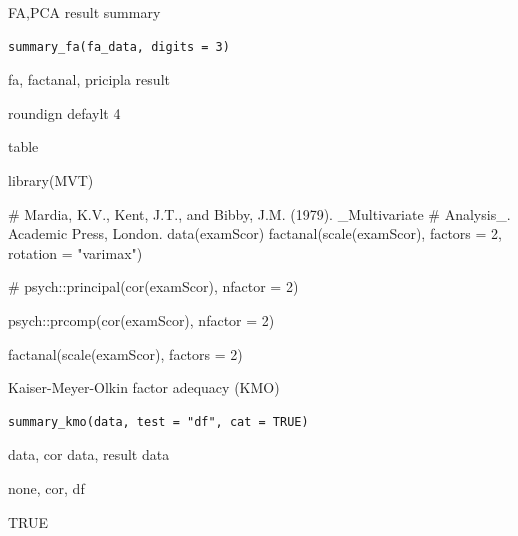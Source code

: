 \documentclass[a4paper]{book}
\begin{document}
%
\begin{Description}
FA,PCA result summary
\end{Description}
%
\begin{Usage}
\begin{verbatim}
summary_fa(fa_data, digits = 3)
\end{verbatim}
\end{Usage}
%
\begin{Arguments}
\begin{ldescription}
\item[\code{fa\_data}] fa, factanal, pricipla result

\item[\code{digits}] roundign defaylt 4
\end{ldescription}
\end{Arguments}
%
\begin{Value}
table
\end{Value}
%
\begin{Examples}
\begin{ExampleCode}

library(MVT)

#  Mardia, K.V., Kent, J.T., and Bibby, J.M. (1979).  _Multivariate
#  Analysis_. Academic Press, London.
data(examScor)
factanal(scale(examScor), factors = 2, rotation = "varimax")%

#
psych::principal(cor(examScor), nfactor = 2) %

psych::prcomp(cor(examScor), nfactor = 2) %

factanal(scale(examScor), factors = 2) %

\end{ExampleCode}
\end{Examples}
%
\begin{Description}
Kaiser-Meyer-Olkin factor adequacy (KMO)
\end{Description}
%
\begin{Usage}
\begin{verbatim}
summary_kmo(data, test = "df", cat = TRUE)
\end{verbatim}
\end{Usage}
%
\begin{Arguments}
\begin{ldescription}
\item[\code{data}] data, cor data, result data

\item[\code{test}] none, cor, df

\item[\code{cat}] TRUE
\end{ldescription}
\end{Arguments}
\end{document}
